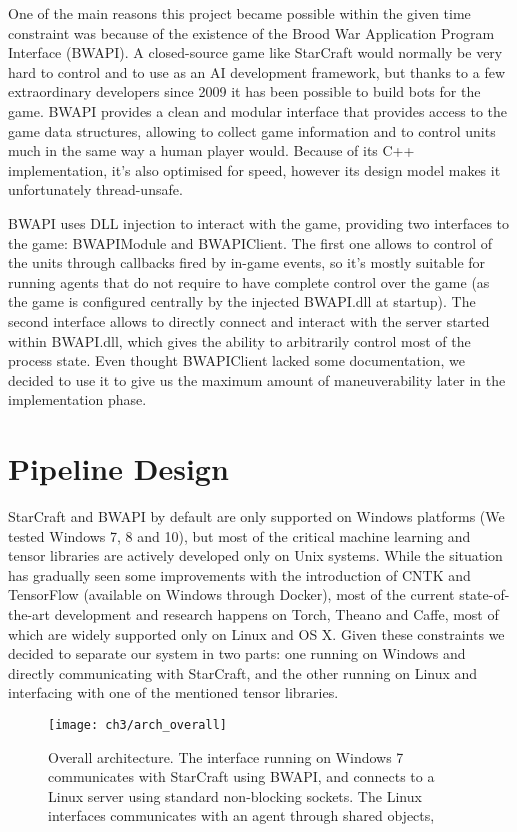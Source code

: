 One of the main reasons this project became possible within the given time
constraint was because of the existence of the Brood War Application Program
Interface (BWAPI). A closed-source game like StarCraft would normally be very
hard to control and to use as an AI development framework, but thanks to a few
extraordinary developers since 2009 it has been possible to build bots for the
game. BWAPI provides a clean and modular interface that provides access to the
game data structures, allowing to collect game information and to control units
much in the same way a human player would. Because of its C++ implementation,
it's also optimised for speed, however its design model makes it unfortunately
thread-unsafe.

BWAPI uses DLL injection to interact with the game, providing two interfaces to
the game: BWAPIModule and BWAPIClient. The first one allows to control of the
units through callbacks fired by in-game events, so it's mostly suitable for
running agents that do not require to have complete control over the game (as
the game is configured centrally by the injected BWAPI.dll at startup). The
second interface allows to directly connect and interact with the server started
within BWAPI.dll, which gives the ability to arbitrarily control most of the
process state. Even thought BWAPIClient lacked some documentation, we decided to
use it to give us the maximum amount of maneuverability later in the
implementation phase.

\section{Pipeline Design} %

StarCraft and BWAPI by default are only supported on Windows platforms (We
tested Windows 7, 8 and 10), but most of the critical machine learning and
tensor libraries are actively developed only on Unix systems. While the
situation has gradually seen some improvements with the introduction of CNTK
\citep{dallycntk} and TensorFlow \cite{abaditensorflow} (available on Windows
through Docker), most of the current state-of-the-art development and research
happens on Torch, Theano and Caffe, most of which are widely supported only on
Linux and OS X. Given these constraints we decided to separate our system in two
parts: one running on Windows and directly communicating with StarCraft, and the
other running on Linux and interfacing with one of the mentioned tensor
libraries.

\begin{figure}[h]
    \centering
    \texttt{[image: ch3/arch\_overall]}
    \caption{Overall architecture. The interface running on Windows 7
      communicates with StarCraft using BWAPI, and connects to a Linux server
      using standard non-blocking sockets. The Linux interfaces communicates
      with an agent through shared objects, }
    \label{fig:arch_ov}
\end{figure}

